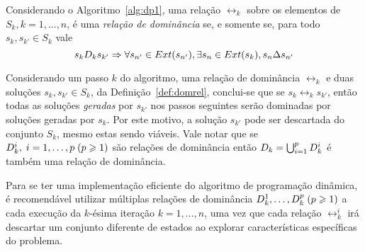 \begin{mydef}
Considerando o Algoritmo~\ref{alg:dp1},
uma relação $\rel_k$ sobre os elementos de $S_k, k = 1,\ldots, n$, é uma \emph{relação de dominância}
se, e somente se, para todo $s_k, s_{k'} \in S_k$ vale
\begin{equation}
  s_k D_k s_{{k'}} \Rightarrow \forall s_{{n'}} \in Ext(s_{{n'}}),
    \exists s_n \in Ext(s_k), s_n \Delta s_{{n'}}
  \label{eq:domrel}
\end{equation}
\label{def:domrel}
\end{mydef}
Considerando um passo $k$ do algoritmo, uma relação de dominância $\rel_k$
e duas soluções $s_k, s_{k'} \in S_k$,
da Definição~\ref{def:domrel}, conclui-se que se $s_k \rel_k s_{k'}$, então
todas as soluções \emph{geradas} por $s_{k'}$ nos passos seguintes serão
dominadas por soluções geradas por $s_k$.
Por este motivo, a solução $s_{k'}$ pode ser descartada do conjunto $S_k$,
mesmo estas sendo viáveis.
Vale notar que se $D_k^i, \; i = 1, \ldots, p\; (p \geqslant 1)$ são relações de dominância
então $D_k = \bigcup^{p}_{i = 1} D_k^i$ é também uma relação de dominância.


Para se ter uma implementação eficiente do algoritmo de programação dinâmica,
é recomendável utilizar múltiplas relações de dominância
$D_k^1, \ldots, D_k^p \; (p \geqslant 1)$ a cada execução da $k$-ésima iteração
$k = 1, \ldots, n$, uma vez que cada relação $\rel_k^i$ irá descartar um conjunto diferente de
estados ao explorar características específicas do problema.

